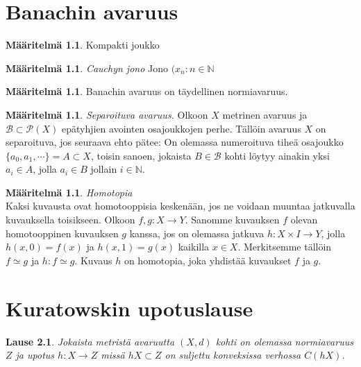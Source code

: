 \documentclass[12pt,a4paper,leqno]{report}
\newcommand{\N}{\mathbb{N}}
\theoremstyle{plain}
\newtheorem{lause}[equation]{Lause}
\theoremstyle{definition}
\newtheorem{maar}[equation]{Määritelmä}
\theoremstyle{remark}
\begin{document}


\chapter{Banachin avaruus}\label{Banach}

\begin{maar}
Kompakti joukko
\end{maar}

\begin{maar}\emph{Cauchyn jono} 
Jono $(x_n\colon n\in \N$

\end{maar}

\begin{maar}Banachin avaruus on täydellinen normiavaruus.
\end{maar}

\begin{maar}\emph{Separoituva avaruus.} Olkoon $X$ metrinen avaruus ja $\mathcal{B}\subset \mathcal{P}( X)$ epätyhjien avointen osajoukkojen perhe. Tällöin avaruus $X$ on separoituva, jos seuraava ehto pätee: On olemassa numeroituva tiheä osajoukko $\{a_0,a_1,\cdots\}=A\subset X$, toisin sanoen, jokaista $B\in\mathcal{B}$ kohti löytyy ainakin yksi $a_i\in A$, jolla $a_i\in B$ jollain $i\in \N$.
\end{maar}

\begin{maar}
\emph{Homotopia}\\
Kaksi kuvausta ovat homotooppisia keskenään, jos ne voidaan muuntaa jatkuvalla kuvauksella toisikseen. Olkoon $f,g\colon X\rightarrow Y$. Sanomme kuvauksen $f$ olevan homotooppinen kuvauksen $g$ kanssa, jos on olemassa jatkuva $h\colon X \times I \rightarrow Y$, jolla $h(x,0)=f(x)$ ja $h(x,1)=g(x)$ kaikilla $x\in X$. Merkitsemme tällöin $f\simeq g$ ja $h\colon f\simeq g$. Kuvaus $h$ on homotopia, joka yhdistää kuvaukset $f$ ja $g$.
\end{maar}


\chapter{Kuratowskin upotuslause}\label{kuratowski}

\begin{lause}
Jokaista metristä avaruutta $(X,d)$ kohti on olemassa normiavaruus $Z$ ja upotus $h\colon X\rightarrow Z$ missä $ hX\subset Z$ on suljettu konveksissa verhossa $C(hX)$. 
\end{lause} 
 
\end{document}
